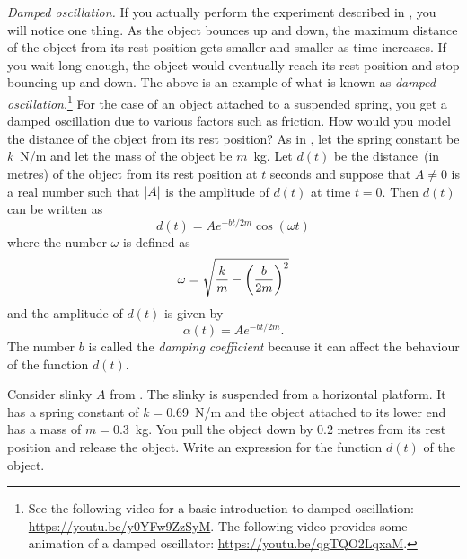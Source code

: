 \documentclass[a4paper,oneside,12pt]{article}
\begin{document}
\begin{problem}
\item\emph{Damped oscillation.}
  If you actually perform the experiment described in
  , you will notice one
  thing.  As the object bounces up and down, the maximum distance of
  the object from its rest position gets smaller and smaller as time
  increases.  If you wait long enough, the object would eventually
  reach its rest position and stop bouncing up and down.  The above is
  an example of what is known as \emph{damped oscillation}.\footnote{
    See the following video for a basic introduction to damped
    oscillation:
    \url{https://youtu.be/y0YFw9ZzSyM}.
    The following video provides some animation of a damped
    oscillator:
    \url{https://youtu.be/qgTQO2LqxaM}.
  }
  For the case of an object attached to a suspended spring, you get a
  damped oscillation due to various factors such as friction.  How
  would you model the distance of the object from its rest position?
  As in , let the
  spring constant be $k$~N/m and let the mass of the object be $m$~kg.
  Let $d(t)$ be the distance~(in metres) of the object from its rest
  position at $t$ seconds and suppose that $A \neq 0$ is a real number
  such that $\lvert A\rvert$ is the amplitude of $d(t)$ at time
  $t = 0$.  Then $d(t)$ can be written as
  \begin{equation}
  \label{eqn:trigonometric:damped_model}
  d(t)
  =
  A e^{-bt / 2m} \cos(\omega t)
  \end{equation}
  where the number $\omega$ is defined as
  \begin{equation}
  \label{eqn:trigonometric:damped_omega}
  \omega
  =
  \sqrt{
    \frac{k}{m}
    -
    \parenthesis*{\frac{b}{2m}}^2
  }
  \end{equation}
  and the amplitude of $d(t)$ is given by
  \begin{equation}
  \label{eqn:trigonometric:damped_amplitude}
  \alpha(t)
  =
  A e^{-bt / 2m}.
  \end{equation}
  The number $b$ is called the \emph{damping coefficient} because it
  can affect the behaviour of the function $d(t)$.
  \begin{packedenum}
  \item\label{subprob:trigonometric:damped_b_constant}
    Consider slinky $A$ from
    .
    The slinky is suspended from a horizontal platform.  It has a
    spring constant of $k = 0.69$~N/m and the object attached to its
    lower end has a mass of $m = 0.3$~kg.  You pull the object down by
    $0.2$ metres from its rest position and release the object.  Write
    an expression for the function $d(t)$ of the object.


\end{packedenum}
\end{problem}
\end{document}
